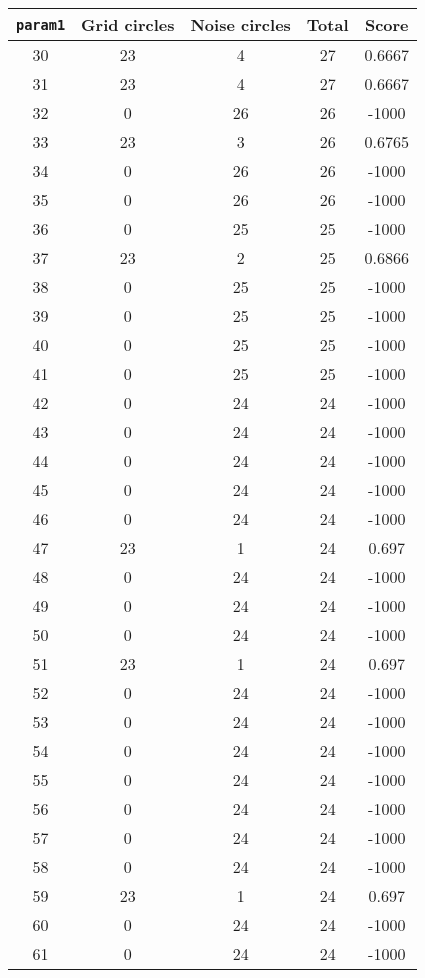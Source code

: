 \documentclass[letterpaper, 12pt]{article}
\begin{document}
\begin{longtable}{|c|c|c|c|c|}
\hline
\textbf{\texttt{param1}} & \textbf{Grid circles} & \textbf{Noise circles} & \textbf{Total} & \textbf{Score} \\
\hline
30 & 23 & 4 & 27 & 0.6667 \\
\hline
31 & 23 & 4 & 27 & 0.6667 \\
\hline
32 & 0 & 26 & 26 & -1000 \\
\hline
33 & 23 & 3 & 26 & 0.6765 \\
\hline
34 & 0 & 26 & 26 & -1000 \\
\hline
35 & 0 & 26 & 26 & -1000 \\
\hline
36 & 0 & 25 & 25 & -1000 \\
\hline
37 & 23 & 2 & 25 & 0.6866 \\
\hline
38 & 0 & 25 & 25 & -1000 \\
\hline
39 & 0 & 25 & 25 & -1000 \\
\hline
40 & 0 & 25 & 25 & -1000 \\
\hline
41 & 0 & 25 & 25 & -1000 \\
\hline
42 & 0 & 24 & 24 & -1000 \\
\hline
43 & 0 & 24 & 24 & -1000 \\
\hline
44 & 0 & 24 & 24 & -1000 \\
\hline
45 & 0 & 24 & 24 & -1000 \\
\hline
46 & 0 & 24 & 24 & -1000 \\
\hline
47 & 23 & 1 & 24 & 0.697 \\
\hline
48 & 0 & 24 & 24 & -1000 \\
\hline
49 & 0 & 24 & 24 & -1000 \\
\hline
50 & 0 & 24 & 24 & -1000 \\
\hline
51 & 23 & 1 & 24 & 0.697 \\
\hline
52 & 0 & 24 & 24 & -1000 \\
\hline
53 & 0 & 24 & 24 & -1000 \\
\hline
54 & 0 & 24 & 24 & -1000 \\
\hline
55 & 0 & 24 & 24 & -1000 \\
\hline
56 & 0 & 24 & 24 & -1000 \\
\hline
57 & 0 & 24 & 24 & -1000 \\
\hline
58 & 0 & 24 & 24 & -1000 \\
\hline
59 & 23 & 1 & 24 & 0.697 \\
\hline
60 & 0 & 24 & 24 & -1000 \\
\hline
61 & 0 & 24 & 24 & -1000 \\

\end{longtable}
\end{document}
